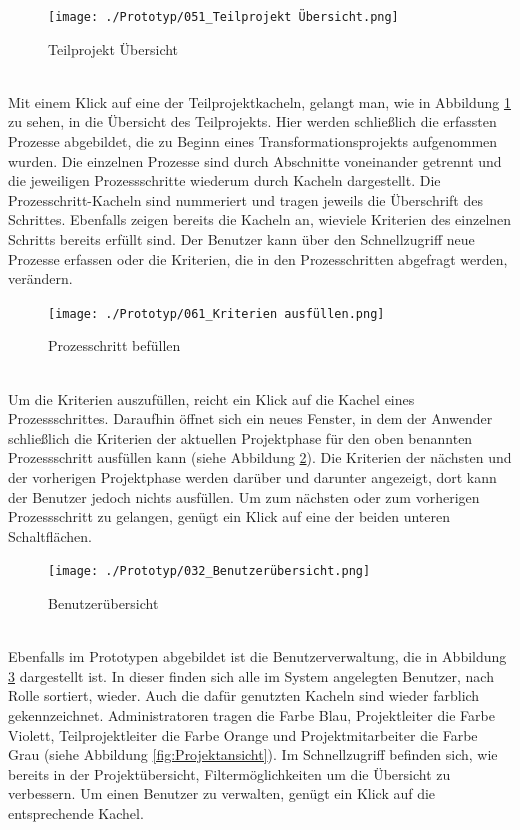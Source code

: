 \begin{figure}[h!]
    \centering
    \texttt{[image: ./Prototyp/051\_Teilprojekt Übersicht.png]}
    \caption[Prototyp: Teilprojekt Übersicht]{Teilprojekt Übersicht}
    \label{fig:TeilprojektÜbersicht}
\end{figure}
\\Mit einem Klick auf eine der Teilprojektkacheln, gelangt man, wie in Abbildung \ref{fig:TeilprojektÜbersicht} zu sehen, in die Übersicht des Teilprojekts. Hier werden schließlich die erfassten Prozesse abgebildet, die zu Beginn eines Transformationsprojekts aufgenommen wurden. Die einzelnen Prozesse sind durch Abschnitte voneinander getrennt und die jeweiligen Prozessschritte wiederum durch Kacheln dargestellt. Die Prozesschritt-Kacheln sind nummeriert und tragen jeweils die Überschrift des Schrittes. Ebenfalls zeigen bereits die Kacheln an, wieviele Kriterien des einzelnen Schritts bereits erfüllt sind. Der Benutzer kann über den Schnellzugriff neue Prozesse erfassen oder die Kriterien, die in den Prozesschritten abgefragt werden, verändern.
\begin{figure}[h!]
    \centering
    \texttt{[image: ./Prototyp/061\_Kriterien ausfüllen.png]}
    \caption[Prototyp: Prozesschritt befüllen]{Prozesschritt befüllen}
    \label{fig:ProzesschrittBefuellen}
\end{figure}
\\Um die Kriterien auszufüllen, reicht ein Klick auf die Kachel eines Prozessschrittes. Daraufhin öffnet sich ein neues Fenster, in dem der Anwender schließlich die Kriterien der aktuellen Projektphase für den oben benannten Prozessschritt ausfüllen kann (siehe Abbildung \ref{fig:ProzesschrittBefuellen}). Die Kriterien der nächsten und der vorherigen Projektphase werden darüber und darunter angezeigt, dort kann der Benutzer jedoch nichts ausfüllen. Um zum nächsten oder zum vorherigen Prozessschritt zu gelangen, genügt ein Klick auf eine der beiden unteren Schaltflächen.
\begin{figure}[h!]
    \centering
    \texttt{[image: ./Prototyp/032\_Benutzerübersicht.png]}
    \caption[Prototyp: Benutzerübersicht]{Benutzerübersicht}
    \label{fig:Benutzeruebersicht}
\end{figure}
\\Ebenfalls im Prototypen abgebildet ist die Benutzerverwaltung, die in Abbildung \ref{fig:Benutzeruebersicht} dargestellt ist. In dieser finden sich alle im System angelegten Benutzer, nach Rolle sortiert, wieder. Auch die dafür genutzten Kacheln sind wieder farblich gekennzeichnet. Administratoren tragen die Farbe Blau, Projektleiter die Farbe Violett, Teilprojektleiter die Farbe Orange und Projektmitarbeiter die Farbe Grau (siehe Abbildung \ref{fig:Projektansicht}). Im Schnellzugriff befinden sich, wie bereits in der Projektübersicht, Filtermöglichkeiten um die Übersicht zu verbessern. Um einen Benutzer zu verwalten, genügt ein Klick auf die entsprechende Kachel.
